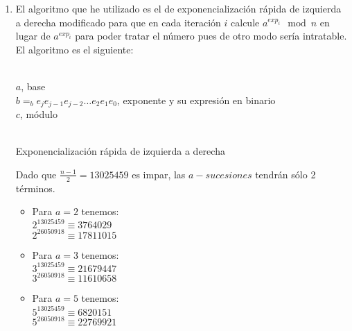 	\begin{enumerate}
		\item El algoritmo que he utilizado es el de exponencialización rápida de izquierda a derecha modificado
		para que en cada iteración $i$ calcule $a^{exp_i} \mod{n}$ en lugar de $a^{exp_i}$ para poder tratar el
		número pues de otro modo sería intratable. El algoritmo es el siguiente:
		\begin{algorithm}[H]
			\begin{algorithmic}[1]
				\REQUIRE \ \\
					\texttt{$a$}, base \\
					\texttt{$b =_b e_je_{j-1}e_{j-2}\dots e_2e_1e_0$}, exponente y su expresión en binario \\
					\texttt{$c$}, módulo\\ \
					\ENDIF
				\ENDWHILE
			\end{algorithmic}
			\caption{Exponencialización rápida de izquierda a derecha}
			\label{Fast-exp}
		\end{algorithm}
		
		Dado que $\displaystyle \frac{n-1}{2} = 13025459$ es impar, las $a-sucesiones$ tendrán sólo 2 términos.
		
		\begin{itemize}
			\item Para $a = 2$ tenemos:\\
				$2^{13025459} \equiv 3764029$\\
				$2^{26050918} \equiv 17811015$\\
				
			\item Para $a = 3$ tenemos:\\
				$3^{13025459} \equiv 21679447$\\
				$3^{26050918} \equiv 11610658$\\
				
			\item Para $a = 5$ tenemos:\\
				$5^{13025459} \equiv 6820151$\\
				$5^{26050918} \equiv 22769921$\\
				

\end{itemize}
\end{enumerate}
